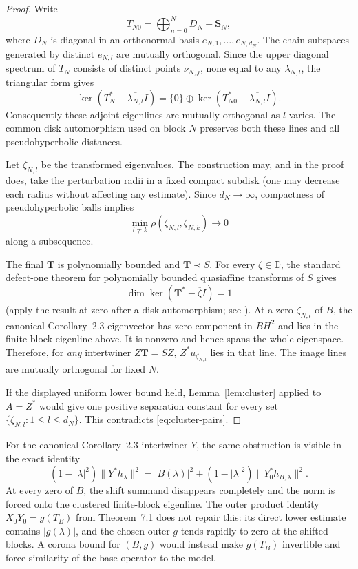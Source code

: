 \documentclass[11pt]{article}
\newcommand{\D}{\mathbb D}
\newcommand{\rhoh}{\rho}
\begin{document}
\begin{proof}
Write
\[
 T_{N0}=\bigoplus_{n=0}^N D_N+\mathbf S_N,
\]
where $D_N$ is diagonal in an orthonormal basis
$e_{N,1},\ldots,e_{N,d_N}$.  The chain subspaces generated by distinct
$e_{N,l}$ are mutually orthogonal.  Since the upper diagonal spectrum of
$T_N$ consists of distinct points $\nu_{N,j}$, none equal to any
$\lambda_{N,l}$, the triangular form gives
\[
 \ker(T_N^*-\overline{\lambda_{N,l}}I)
 =\{0\}\oplus\ker(T_{N0}^*-\overline{\lambda_{N,l}}I).
\]
Consequently these adjoint eigenlines are mutually orthogonal as $l$ varies.
The common disk automorphism used on block $N$ preserves both these lines
and all pseudohyperbolic distances.

Let $\zeta_{N,l}$ be the transformed eigenvalues.  The construction may,
and in the proof does, take the perturbation radii in a fixed compact
subdisk (one may decrease each radius without affecting any estimate).
Since $d_N\to\infty$, compactness of pseudohyperbolic balls implies
\begin{equation}\label{eq:cluster-pairs}
 \min_{l\neq k}\rhoh(\zeta_{N,l},\zeta_{N,k})\longrightarrow0
\end{equation}
along a subsequence.

The final $\mathbf T$ is polynomially bounded and $\mathbf T\prec S$.
For every $\zeta\in\D$, the standard defect-one theorem for polynomially
bounded quasiaffine transforms of $S$ gives
\[
 \dim\ker(\mathbf T^*-\overline\zeta I)=1
\]
(apply the result at zero after a disk automorphism; see
\cite{BercoviciPrunaru,Gamal2019}).  At a zero $\zeta_{N,l}$ of $B$, the
canonical Corollary~2.3 eigenvector has zero component in $BH^2$ and lies in
the finite-block eigenline above.  It is nonzero and hence spans the whole
eigenspace.  Therefore, for \emph{any} intertwiner $Z\mathbf T=SZ$,
$Z^*u_{\zeta_{N,l}}$ lies in that line.  The image lines are mutually
orthogonal for fixed $N$.

If the displayed uniform lower bound held, Lemma~\ref{lem:cluster} applied
to $A=Z^*$ would give one positive separation constant for every set
$\{\zeta_{N,l}:1\leq l\leq d_N\}$.  This contradicts
\eqref{eq:cluster-pairs}.
\end{proof}

For the canonical Corollary~2.3 intertwiner $Y$, the same obstruction is
visible in the exact identity
\[
 (1-|\lambda|^2)\|Y^*h_\lambda\|^2
 =|B(\lambda)|^2
 +(1-|\lambda|^2)\|Y_0^*h_{B,\lambda}\|^2.
\]
At every zero of $B$, the shift summand disappears completely and the norm
is forced onto the clustered finite-block eigenline.  The outer product
identity $X_0Y_0=g(T_B)$ from Theorem~7.1 does not repair this: its direct
lower estimate contains $|g(\lambda)|$, and the chosen outer $g$ tends
rapidly to zero at the shifted blocks.  A corona bound for $(B,g)$ would
instead make $g(T_B)$ invertible and force similarity of the base operator
to the model.
\end{document}
